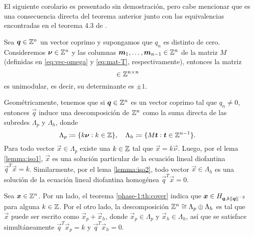 El siguiente corolario es presentado sin demostración, pero cabe mencionar que es una consecuencia
directa del teorema anterior junto con las equivalencias encontradas en el teorema 4.3 de \cite{alex}.
\begin{corollary}
	\label{cor:unimodular}
	Sea $\boldsymbol{q} \in \mathbb{Z}^n$ un vector coprimo y supongamos que $q_n$ es distinto de cero.
	Consideremos $\boldsymbol{\nu} \in \mathbb{Z}^n$ y las columnas $\boldsymbol{m}_1, \ldots, \boldsymbol{m}_{n-1} \in \mathbb{Z}^n$ de
	la matriz $M$ (definidas en \eqref{eq:vec-omega} y \eqref{eq:mat-T}, respectivamente), entonces
	la matriz
	\begin{equation*}
		[ \vec{\nu} \mid \vec{m}_1 \mid \cdots \mid \vec{m}_{n-1} ] \in \Z^{n \times n}
	\end{equation*}
	es unimodular, es decir, su determinante es $\pm 1$.
\end{corollary}


Geométricamente, tenemos que si $\boldsymbol{q} \in \mathbb{Z}^n$ es un vector coprimo tal que $q_n \neq 0$,
entonces $\vec{q}$ induce una descomposición de $\mathbb{Z}^n$ como la suma directa de las subredes
$\Lambda_p$ y $\Lambda_h$, donde
\begin{equation*}
	\Lambda_p \coloneq \lbrace k\boldsymbol{\nu} \vcentcolon k \in \mathbb{Z} \rbrace, \quad
	\Lambda_h \coloneq \lbrace M\boldsymbol{t} \vcentcolon \boldsymbol{t} \in \mathbb{Z}^{n-1} \rbrace.
\end{equation*}
Para todo vector $\vec{x} \in \Lambda_p$ existe una $k \in \mathbb{Z}$ tal que $\vec{x} =
k\vec{\nu}$. Luego, por el lema \ref{lemma:iso1}, $\vec{x}$ es una solución particular de la
ecuación lineal diofantina $\vec{q}^T\vec{x} = k$. Similarmente, por el lema \ref{lemma:iso2}, todo
vector $\vec{x} \in \Lambda_h$ es una solución de la ecuación lineal diofantina homogénea
$\vec{q}^T\vec{x} = 0$.

Sea $\boldsymbol{x} \in \mathbb{Z}^n$. Por un lado, el teorema \ref{phase-1:th:cover} indica que $\boldsymbol{x} \in
H_{\boldsymbol{q}, k\left\lVert \boldsymbol{q} \right\rVert^{-2}}$ para alguna $k \in \mathbb{Z}$. Por el otro lado, la descomposición $\mathbb{Z}^n \cong \Lambda_p
\oplus \Lambda_h$ es tal que $\vec{x}$ puede ser escrito como $\vec{x}_p + \vec{x}_h$,
donde $\vec{x}_p \in \Lambda_p$ y $\vec{x}_h \in \Lambda_h$, así que se satisface simultáneamente
$\vec{q}^T\vec{x}_p = k$ y $\vec{q}^T\vec{x}_h = 0$.

